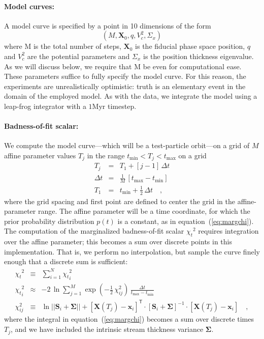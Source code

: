 \documentclass[12pt,preprint]{aastex}
\newcommand{\mtensor}[1]{\boldsymbol{#1}}
\newcommand{\mS}{\mtensor{S}}
\newcommand{\mSigma}{\mtensor{\Sigma}}
\newcommand{\mvector}[1]{\mtensor{#1}}
\newcommand{\vx}{\mvector{x}}
\newcommand{\vX}{\mvector{X}}
\newcommand{\inverse}[1]{{#1}^{-1}}
\newcommand{\transpose}[1]{{#1}^{\textsf{T}}}
\renewcommand{\det}[1]{||{#1}||}
\newcommand{\unit}[1]{\mathrm{#1}}
\newcommand{\Myr}{\unit{Myr}}
\newcommand{\margchi}{{\chi_t}}
\newcommand{\tmin}{t_{\mathrm{min}}}
\newcommand{\tmax}{t_{\mathrm{max}}}
\newcommand{\equationname}{equation}
\begin{document}
\paragraph{Model curves:}
A model curve is specified by a point in 10 dimensions of the form 
\[ (M,\vX_0,q,V_c^2,\Sigma_x)\]
where M is the total number of steps, $\vX_0$ is the fiducial phase space position,
$q$ and $V_c^2$ are the potential parameters and $\Sigma_x$ is the position
thickness eigenvalue. As we will discuss below, we require that M be even for computational ease. 
These parameters suffice to fully specify the model curve. For this reason, the 
experiments are unrealistically optimistic:
truth is an elementary event in the domain of the employed model. As with the data,
we integrate the model using a leap-frog integrator with a $1\Myr$ timestep. 

\paragraph{Badness-of-fit scalar:}
We compute the model curve---which will be a test-particle orbit---on
a grid of $M$ affine parameter values $T_j$ in the range
$\tmin<T_j<\tmax$ on a grid
\begin{eqnarray}\displaystyle
T_j &=& T_1 + [j-1]\,\Delta t
\nonumber\\
\Delta t &=& \frac{1}{M}\,[\tmax-\tmin]
\nonumber\\
T_1 &=& \tmin+\frac{1}{2}\,\Delta t
\quad,
\end{eqnarray}
where the grid spacing and first point are defined to center the grid
in the affine-parameter range.  The affine parameter will be a time
coordinate, for which the prior probability distribution $p(t)$ is a
constant, as in \equationname~(\ref{eq:margchi}).  The computation of
the marginalized badness-of-fit scalar $\margchi^2$ requires
integration over the affine parameter; this becomes a sum over
discrete points in this implementation.  That is, we perform no
interpolation, but sample the curve finely enough that a discrete sum
is sufficient:
\begin{eqnarray}\displaystyle
\margchi^2 &\equiv& \sum_{i=1}^N \margchi_i^2
\nonumber\\
\margchi_i^2 &\approx& -2\,\ln\sum_{j=1}^M \exp(-\frac{1}{2}\,\chi_{ij}^2)\,\frac{\Delta t}{\tmax-\tmin}
\nonumber\\
\chi_{ij}^2 &\equiv& \ln\det{\mS_i + \mSigma}
  + \transpose{\left[\vX(T_j) - \vx_i\right]}
  \cdot\inverse{\left[\mS_i+\mSigma\right]}\cdot\left[\vX(T_j) - \vx_i\right]
\quad,
\end{eqnarray}
where the integral in \equationname~(\ref{eq:margchi}) becomes a sum
over discrete times $T_j$, and we have included the intrinsic stream
thickness variance $\mSigma$.
\end{document}
